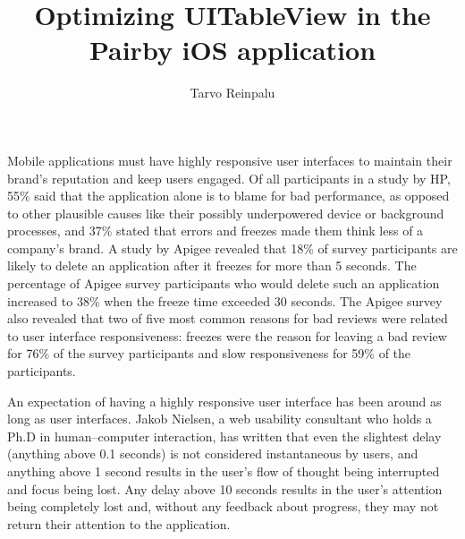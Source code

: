\documentclass[a4paper,12pt]{article}
\begin{document}
\begin{itkTitlePage}
\title{Optimizing UITableView in the Pairby iOS application}
\author{Tarvo Reinpalu}
\end{itkTitlePage}




\itkMakeAuthorDeclaration

\clearpage
\thispagestyle{empty}
\setcounter{tocdepth}{2}
\tableofcontents




Mobile applications must have highly responsive user interfaces to maintain their brand's reputation and keep users engaged.\cite{AppSpeedStudyHP}\cite{AppSpeedStudyApigee} Of all participants in a study by HP, 55\% said that the application alone is to blame for bad performance, as opposed to other plausible causes like their possibly underpowered device or background processes, and 37\% stated that errors and freezes made them think less of a company’s brand.\cite{AppSpeedStudyHP} A study by Apigee revealed that 18\% of survey participants are likely to delete an application after it freezes for more than 5 seconds.\cite{AppSpeedStudyApigee} The percentage of Apigee survey participants who would delete such an application increased to 38\% when the freeze time exceeded 30 seconds.\cite{AppSpeedStudyApigee} The Apigee survey also revealed that two of five most common reasons for bad reviews were related to user interface responsiveness: freezes were the reason for leaving a bad review for 76\% of the survey participants and slow responsiveness for 59\% of the participants.\cite{AppSpeedStudyApigee}

An expectation of having a highly responsive user interface has been around as long as user interfaces.\cite{NielsenUsabilityEngineering} Jakob Nielsen, a web usability consultant who holds a Ph.D in human–computer interaction\cite{JakobNielsenNNGroup}, has written that even the slightest delay (anything above 0.1 seconds) is not considered instantaneous by users, and anything above 1 second results in the user's flow of thought being interrupted and focus being lost.\cite{NielsenUsabilityEngineering} Any delay above 10 seconds results in the user's attention being completely lost and, without any feedback about progress, they may not return their attention to the application.\cite{NielsenUsabilityEngineering}
\end{document}
